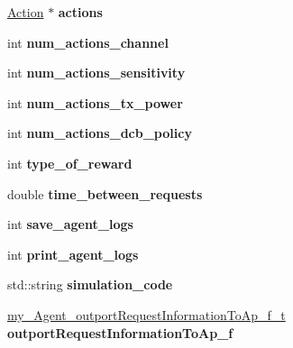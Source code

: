\begin{DoxyCompactItemize}
\hyperlink{structAction}{Action} $\ast$ {\bfseries actions}
\item 
\mbox{\label{classcompcxx__Agent__25_a7cf530cb0215d06c543ea6362b9de3b1}} 
int {\bfseries num\+\_\+actions\+\_\+channel}
\item 
\mbox{\label{classcompcxx__Agent__25_a6da40f193f5cd6e20ebfb7ef92ffeae9}} 
int {\bfseries num\+\_\+actions\+\_\+sensitivity}
\item 
\mbox{\label{classcompcxx__Agent__25_a4c267340f0dd3332bf625ff80d156ffc}} 
int {\bfseries num\+\_\+actions\+\_\+tx\+\_\+power}
\item 
\mbox{\label{classcompcxx__Agent__25_a8eec5256c73aefc2b0fbc93d87ee4034}} 
int {\bfseries num\+\_\+actions\+\_\+dcb\+\_\+policy}
\item 
\mbox{\label{classcompcxx__Agent__25_a2c59ff7d8f0218a023a3d643878998bf}} 
int {\bfseries type\+\_\+of\+\_\+reward}
\item 
\mbox{\label{classcompcxx__Agent__25_a1696b03bde44c35366b42c042f429548}} 
double {\bfseries time\+\_\+between\+\_\+requests}
\item 
\mbox{\label{classcompcxx__Agent__25_acd0cdd7c585fcf095911fa918ba685d7}} 
int {\bfseries save\+\_\+agent\+\_\+logs}
\item 
\mbox{\label{classcompcxx__Agent__25_ac8ab464ff53c21626fcc571ebd88b96b}} 
int {\bfseries print\+\_\+agent\+\_\+logs}
\item 
\mbox{\label{classcompcxx__Agent__25_a9d7353ccb286cf911420534676bfcd19}} 
std\+::string {\bfseries simulation\+\_\+code}
\item 
\mbox{\label{classcompcxx__Agent__25_a7d9935510c1c0a234d498e50fe6b19c5}} 
\hyperlink{classcompcxx__Agent__25_1_1my__Agent__outportRequestInformationToAp__f__t}{my\+\_\+\+Agent\+\_\+outport\+Request\+Information\+To\+Ap\+\_\+f\+\_\+t} {\bfseries outport\+Request\+Information\+To\+Ap\+\_\+f}

\end{DoxyCompactItemize}
